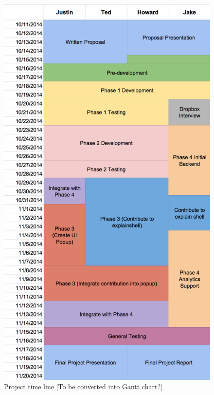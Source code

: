 \documentclass[11pt]{article}
\begin{document}
\begin{figure}[htb]
\centering
\includegraphics[width=.6\textwidth]{chart.png}
\caption{Project time line [To be converted into Gantt chart?]\label{fig:timetable}}
\end{figure}
\end{document}
